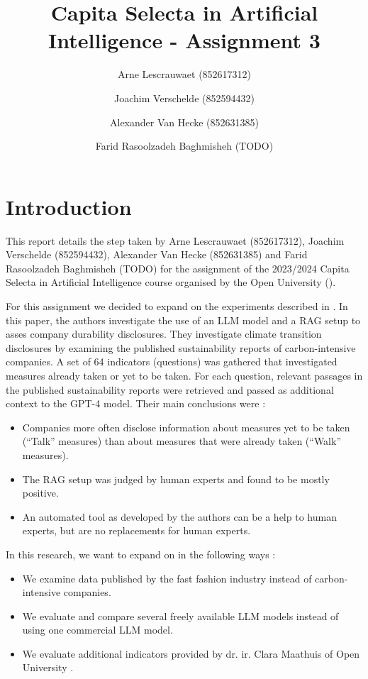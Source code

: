 \documentclass[]{article}
\title{Capita Selecta in Artificial Intelligence - Assignment 3}
\author{Arne Lescrauwaet \small(852617312) \and Joachim Verschelde \small(852594432) \and Alexander Van Hecke \small(852631385) \and Farid Rasoolzadeh Baghmisheh \small(TODO)}
\begin{document}
\maketitle

\section{Introduction}
This report details the step taken by Arne Lescrauwaet (852617312), Joachim Verschelde (852594432), Alexander Van Hecke (852631385) and Farid Rasoolzadeh Baghmisheh (TODO) for the assignment of the 2023/2024 Capita Selecta in Artificial Intelligence course organised by the Open University (\cite{ou}).

For this assignment we decided to expand on the experiments described in \cite{durability}.
In this paper, the authors investigate the use of an LLM model and a RAG setup \cite{rag} to asses company durability disclosures.
They investigate climate transition disclosures by examining the published sustainability reports of carbon-intensive companies.
A set of 64 indicators (questions) was gathered that investigated measures already taken or yet to be taken.
For each question, relevant passages in the published sustainability reports were retrieved and passed as additional context to the GPT-4 model.
Their main conclusions were :

\begin{itemize}
    \item Companies more often disclose information about measures yet to be taken (``Talk'' measures) than about measures that were already taken (``Walk'' measures).
    \item The RAG setup was judged by human experts and found to be mostly positive.
    \item An automated tool as developed by the authors can be a help to human experts, but are no replacements for human experts.
\end{itemize}

In this research, we want to expand on \cite{durability} in the following ways :

\begin{itemize}
    \item We examine data published by the fast fashion industry instead of carbon-intensive companies.
    \item We evaluate and compare several freely available LLM models instead of using one commercial LLM model.
    \item We evaluate additional indicators provided by dr. ir. Clara Maathuis of Open University \cite{ou}.
\end{itemize}
\end{document}
